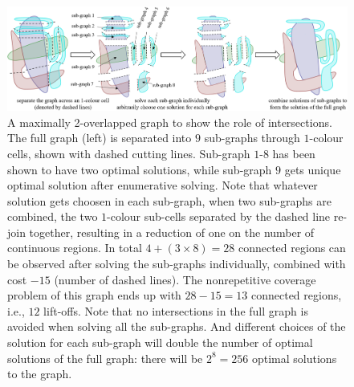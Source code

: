 \documentclass[conference]{IEEEtran}
\begin{document}
\begin{figure}[t]
\centering
\includegraphics[width=\textwidth]{figures/two_overlapped_graph_2}
\caption{A maximally 2-overlapped graph to show the role of intersections. The full graph (left) is separated into $9$ sub-graphs through $1$-colour cells, shown with dashed cutting lines. Sub-graph $1$-$8$ has been shown to have two optimal solutions, while sub-graph $9$ gets unique optimal solution after enumerative solving. Note that whatever solution gets choosen in each sub-graph, when two sub-graphs are combined, the two $1$-colour sub-cells separated by the dashed line re-join together, resulting in a reduction of one on the number of continuous regions. In total $4+(3\times 8)=28$ connected regions can be observed after solving the sub-graphs individually, combined with cost $-15$ (number of dashed lines). The nonrepetitive coverage problem of this graph ends up with $28-15=13$ connected regions, i.e., $12$ lift-offs. 
Note that no intersections in the full graph is avoided when solving all the sub-graphs. And different choices of the solution for each sub-graph will double the number of optimal solutions of the full graph: there will be $2^8=256$ optimal solutions to the graph.
}
\label{fig:two_overlapped_graph}
\end{figure}
\end{document}
